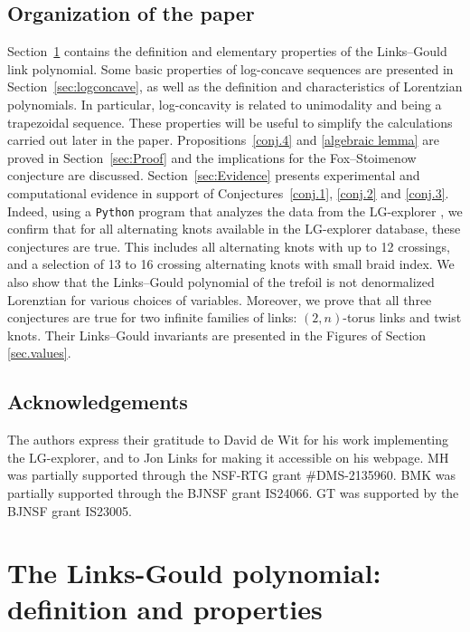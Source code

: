 \documentclass[12pt,reqno]{amsart}
\theoremstyle{definition}
\def\LG{\mathrm{LG}}
\begin{document}
\subsection{Organization of the paper} Section~\ref{sec:DefLG} contains the definition and elementary properties of the Links--Gould link polynomial. Some basic properties of log-concave sequences are presented in Section~\ref{sec:logconcave}, as well as the definition and characteristics of Lorentzian polynomials. In particular, log-concavity is related to unimodality and being a trapezoidal sequence. These properties will be useful to simplify the calculations carried out later in the paper. Propositions~\ref{conj.4} and \ref{algebraic lemma} are proved in Section~\ref{sec:Proof} and the implications for the Fox--Stoimenow conjecture are discussed. Section~\ref{sec:Evidence} presents experimental and computational evidence in support of Conjectures~\ref{conj.1}, \ref{conj.2} and \ref{conj.3}. Indeed, using a \texttt{Python} program \cite{data} that analyzes the data from the $\LG$-explorer \cite{LGexplorer}, we confirm that for all alternating knots available in the $\LG$-explorer database, these conjectures are true. This includes all alternating knots with up to 12 crossings, and a selection of 13 to 16 crossing alternating knots with small braid index. We also show that the Links--Gould polynomial of the trefoil is not denormalized Lorenztian for various choices of variables.  Moreover, we prove that all three conjectures are true for two infinite families of links: \texorpdfstring{$(2,n)$}{(2,n)}-torus links and twist knots. Their Links--Gould invariants are presented in the Figures of Section \ref{sec.values}. 



\subsection*{Acknowledgements}
The authors express their gratitude to David de Wit for his work implementing the $\LG$-explorer, and to Jon Links for making it accessible on his webpage. MH was partially supported through the NSF-RTG grant
\#DMS-2135960. BMK was partially supported through the BJNSF grant IS24066. GT was supported by the BJNSF grant IS23005.


\section{The Links-Gould polynomial: definition and properties}\label{sec:DefLG}
\end{document}
